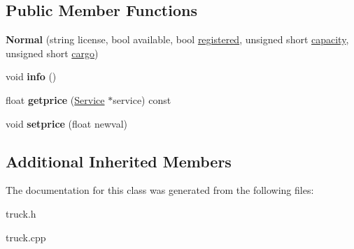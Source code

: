 \subsection*{Public Member Functions}
\begin{DoxyCompactItemize}
\item 
\mbox{\label{class_normal_a5bfcd1d763c6cf56bdcf4de370903da7}} 
{\bfseries Normal} (string license, bool available, bool \hyperlink{class_truck_a80b8405cf7a15b236fef70116f99c4fb}{registered}, unsigned short \hyperlink{class_truck_a14541fad6d47c606ce4e1bd150a68a23}{capacity}, unsigned short \hyperlink{class_truck_a968fc6b1a6171a03e4254d6615da4ecd}{cargo})
\item 
\mbox{\label{class_normal_ade6add2ee09e701113534c97e2a03307}} 
void {\bfseries info} ()
\item 
\mbox{\label{class_normal_aede7fcc331204acb77842e0ca436580e}} 
float {\bfseries getprice} (\hyperlink{class_service}{Service} $\ast$service) const
\item 
\mbox{\label{class_normal_a64dc32fa9341831f95ee8755d791b4e9}} 
void {\bfseries setprice} (float newval)
\end{DoxyCompactItemize}
\subsection*{Additional Inherited Members}


The documentation for this class was generated from the following files\+:\begin{DoxyCompactItemize}
\item 
truck.\+h\item 
truck.\+cpp\end{DoxyCompactItemize}
